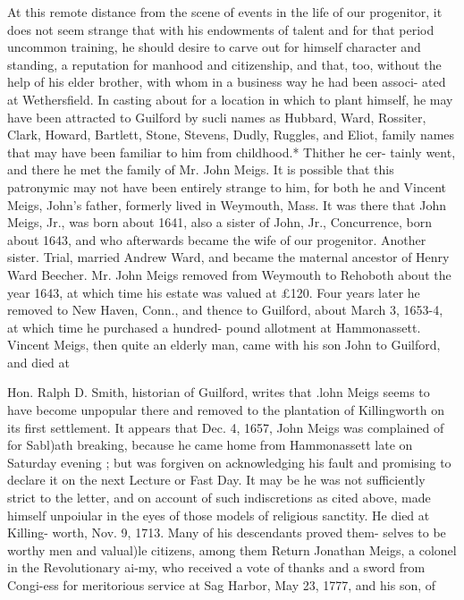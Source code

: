 \documentclass{book}
\begin{document}
At this remote distance from the scene of events in the life of 
our progenitor, it does not seem strange that with his endowments 
of talent and for that period uncommon training, he should desire 
to carve out for himself character and standing, a reputation for 
manhood and citizenship, and that, too, without the help of his 
elder brother, with whom in a business way he had been associ- 
ated at Wethersfield. In casting about for a location in which to 
plant himself, he may have been attracted to Guilford by sucli 
names as Hubbard, Ward, Rossiter, Clark, Howard, Bartlett, 
Stone, Stevens, Dudly, Ruggles, and Eliot, family names that 
may have been familiar to him from childhood.* Thither he cer- 
tainly went, and there he met the family of Mr. John Meigs. It 
is possible that this patronymic may not have been entirely strange 
to him, for both he and Vincent Meigs, John's father, formerly 
lived in Weymouth, Mass. It was there that John Meigs, Jr., 
was born about 1641, also a sister of John, Jr., Concurrence, 
born about 1643, and who afterwards became the wife of our 
progenitor. Another sister. Trial, married Andrew Ward, and 
became the maternal ancestor of Henry Ward Beecher. Mr. 
John Meigs removed from Weymouth to Rehoboth about the year 
1643, at which time his estate was valued at £120. Four years 
later he removed to New Haven, Conn., and thence to Guilford, 
about March 3, 1653-4, at which time he purchased a hundred- 
pound allotment at Hammonassett. Vincent Meigs, then quite 
an elderly man, came with his son John to Guilford, and died at 

Hon. Ralph D. Smith, historian of Guilford, writes that .lohn 
Meigs seems to have become unpopular there and removed to the 
plantation of Killingworth on its first settlement. It appears 
that Dec. 4, 1657, John Meigs was complained of for Sabl)ath 
breaking, because he came home from Hammonassett late on 
Saturday evening ; but was forgiven on acknowledging his fault 
and promising to declare it on the next Lecture or Fast Day. It 
may be he was not sufficiently strict to the letter, and on account 
of such indiscretions as cited above, made himself unpoiular in 
the eyes of those models of religious sanctity. He died at Killing- 
worth, Nov. 9, 1713. Many of his descendants proved them- 
selves to be worthy men and valual)le citizens, among them 
Return Jonathan Meigs, a colonel in the Revolutionary ai-my, 
who received a vote of thanks and a sword from Congi-ess for 
meritorious service at Sag Harbor, May 23, 1777, and his son, of 
\end{document}
